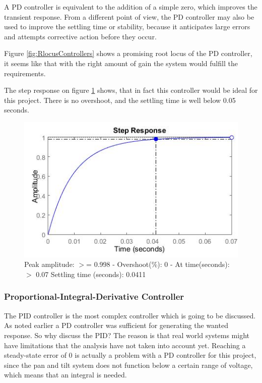 A PD controller is equivalent to the addition of a simple zero, which improves the transient response. From a different point of view, the PD controller may also be used to improve the settling time or stability, because it anticipates large errors and attempts corrective action before they occur. 

Figure \ref{fig:RlocusControllers} shows a promising root locus of the PD controller, it seems like that with the right amount of gain the system would fulfill the requirements.

The step response on figure \ref{fig:PDStep} shows, that in fact this controller would be ideal for this project. There is no overshoot, and the settling time is well below 0.05 seconds.

\begin{figure}[h!]
\centering
\includegraphics[scale=0.7]{Billeder/PDStep.jpg}
\caption{ Peak amplitude: $>$= 0.998 - Overshoot(\%): 0 - At time(seconds): $>$ 0.07
		 Settling time (seconds): 0.0411 }
\label{fig:PDStep}
\end{figure}

\subsubsection{Proportional-Integral-Derivative Controller}

The PID controller is the most complex controller which is going to be discussed. As noted earlier a PD controller was sufficient for generating the wanted response. So why discuss the PID? The reason is that real world systems might have limitations that the analysis have not taken into account yet. Reaching a steady-state error of 0 is actually a problem with a PD controller for this project, since the pan and tilt system does not function below a certain range of voltage, which means that an integral is needed.\par

